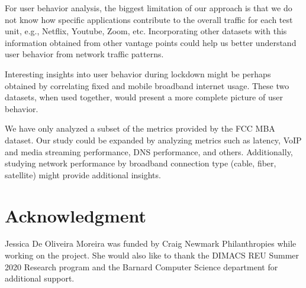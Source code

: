 \documentclass[conference,10pt]{IEEEtran}
\begin{document}
For user behavior analysis, the biggest limitation of our approach is that we do not know how specific applications contribute to the overall traffic for each test unit, e.g., Netflix, Youtube, Zoom, etc. Incorporating other datasets with this information obtained from other vantage points could help us better understand user behavior from network traffic patterns.

Interesting insights into user behavior during lockdown might be perhaps obtained by correlating fixed and mobile broadband internet usage. These two datasets, when used together, would present a more complete picture of user behavior.

We have only analyzed a subset of the metrics provided by the \gls{FCC} \gls{MBA} dataset. Our study could be expanded by analyzing metrics such as latency, \gls{VoIP} and media streaming performance, \gls{DNS} performance, and others. Additionally, studying network performance by broadband connection type (cable, fiber, satellite) might provide additional insights.

\section*{Acknowledgment}\label{sec:acknowledgment}

Jessica De Oliveira Moreira was funded by Craig Newmark Philanthropies while working on the project. She would also like to thank the \gls{DIMACS} \gls{REU} Summer 2020 Research program and the Barnard Computer Science department for additional support.



\end{document}
